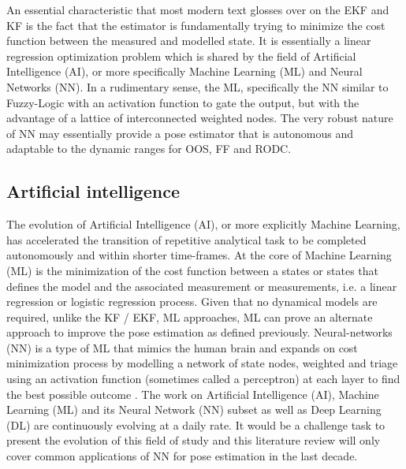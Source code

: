 
An essential characteristic that most modern text glosses over on the EKF and KF is the fact that the estimator is fundamentally trying to minimize the cost function between the measured and modelled state. It is essentially a linear regression optimization problem which is shared by the field of Artificial Intelligence (AI), or more specifically Machine Learning (ML) and Neural Networks (NN). In a rudimentary sense, the ML, specifically the NN similar to Fuzzy-Logic with an activation function to gate the output, but with the advantage of a lattice of interconnected weighted nodes. The very robust nature of NN may essentially provide a pose estimator that is autonomous and adaptable to the dynamic ranges for OOS, FF and RODC. 

\subsection{Artificial intelligence}\label{CHAP1_3_2}
The evolution of Artificial Intelligence (AI), or more explicitly Machine Learning, has accelerated the transition of repetitive analytical task to be completed autonomously and within shorter time-frames. At the core of Machine Learning (ML) is the minimization of the cost function between a states or states that defines the model and the associated measurement or measurements, i.e. a linear regression or logistic regression process. Given that no dynamical models are required, unlike the KF / EKF, ML approaches, ML can prove an alternate approach to improve the pose estimation as defined previously. Neural-networks (NN) is a type of ML that mimics the human brain and expands on cost minimization process by modelling a network of state nodes, weighted and triage using an activation function (sometimes called a perceptron) at each layer to find the best possible outcome \cite{yangML21}. The work on Artificial Intelligence (AI), Machine Learning (ML) and its Neural Network (NN) subset as well as Deep Learning (DL) are continuously evolving at a daily rate. It would be a challenge task to present the evolution of this field of study and this literature review will only cover common applications of NN for pose estimation in the last decade.

